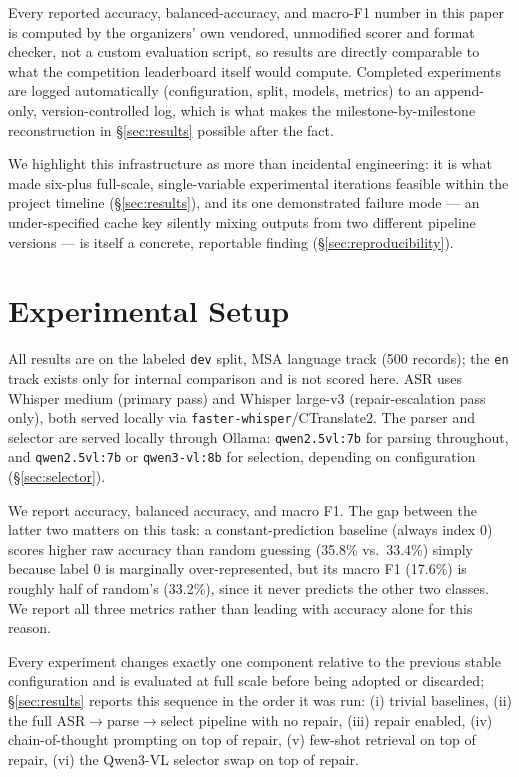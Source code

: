 \documentclass[11pt]{article}
\begin{document}
Every reported accuracy, balanced-accuracy, and macro-F1 number in this paper is computed by the organizers' own vendored, unmodified scorer and format checker, not a custom evaluation script, so results are directly comparable to what the competition leaderboard itself would compute. Completed experiments are logged automatically (configuration, split, models, metrics) to an append-only, version-controlled log, which is what makes the milestone-by-milestone reconstruction in \S\ref{sec:results} possible after the fact.

We highlight this infrastructure as more than incidental engineering: it is what made six-plus full-scale, single-variable experimental iterations feasible within the project timeline (\S\ref{sec:results}), and its one demonstrated failure mode --- an under-specified cache key silently mixing outputs from two different pipeline versions --- is itself a concrete, reportable finding (\S\ref{sec:reproducibility}).

\section{Experimental Setup}
\label{sec:setup}

All results are on the labeled \texttt{dev} split, MSA language track (500 records); the \texttt{en} track exists only for internal comparison and is not scored here. ASR uses Whisper medium (primary pass) and Whisper large-v3 (repair-escalation pass only), both served locally via \texttt{faster-whisper}/CTranslate2. The parser and selector are served locally through Ollama: \texttt{qwen2.5vl:7b} for parsing throughout, and \texttt{qwen2.5vl:7b} or \texttt{qwen3-vl:8b} for selection, depending on configuration (\S\ref{sec:selector}).

We report accuracy, balanced accuracy, and macro F1. The gap between the latter two matters on this task: a constant-prediction baseline (always index 0) scores higher raw accuracy than random guessing (35.8\% vs.\ 33.4\%) simply because label 0 is marginally over-represented, but its macro F1 (17.6\%) is roughly half of random's (33.2\%), since it never predicts the other two classes. We report all three metrics rather than leading with accuracy alone for this reason.

Every experiment changes exactly one component relative to the previous stable configuration and is evaluated at full scale before being adopted or discarded; \S\ref{sec:results} reports this sequence in the order it was run: (i) trivial baselines, (ii) the full ASR$\rightarrow$parse$\rightarrow$select pipeline with no repair, (iii) repair enabled, (iv) chain-of-thought prompting on top of repair, (v) few-shot retrieval on top of repair, (vi) the Qwen3-VL selector swap on top of repair.
\end{document}
